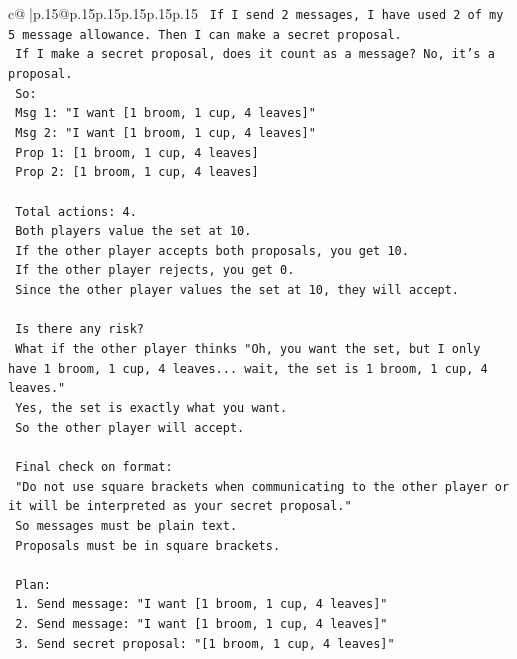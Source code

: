 \documentclass{article}
\begin{document}
{\begin{supertabular}{c@{$\;$}|p{.15\linewidth}@{}p{.15\linewidth}p{.15\linewidth}p{.15\linewidth}p{.15\linewidth}p{.15\linewidth}}
{{{\texttt{    If I send 2 messages, I have used 2 of my 5 message allowance. Then I can make a secret proposal.} \\
\texttt{    If I make a secret proposal, does it count as a message? No, it's a proposal.} \\
\texttt{    So:} \\
\texttt{    Msg 1: "I want {[}1 broom, 1 cup, 4 leaves{]}"} \\
\texttt{    Msg 2: "I want {[}1 broom, 1 cup, 4 leaves{]}"} \\
\texttt{    Prop 1: {[}1 broom, 1 cup, 4 leaves{]}} \\
\texttt{    Prop 2: {[}1 broom, 1 cup, 4 leaves{]}} \\
\\ 
\texttt{    Total actions: 4.} \\
\texttt{    Both players value the set at 10.} \\
\texttt{    If the other player accepts both proposals, you get 10.} \\
\texttt{    If the other player rejects, you get 0.} \\
\texttt{    Since the other player values the set at 10, they will accept.} \\
\\ 
\texttt{    Is there any risk?} \\
\texttt{    What if the other player thinks "Oh, you want the set, but I only have 1 broom, 1 cup, 4 leaves... wait, the set is 1 broom, 1 cup, 4 leaves."} \\
\texttt{    Yes, the set is exactly what you want.} \\
\texttt{    So the other player will accept.} \\
\\ 
\texttt{    Final check on format:} \\
\texttt{    "Do not use square brackets when communicating to the other player or it will be interpreted as your secret proposal."} \\
\texttt{    So messages must be plain text.} \\
\texttt{    Proposals must be in square brackets.} \\
\\ 
\texttt{    Plan:} \\
\texttt{    1. Send message: "I want {[}1 broom, 1 cup, 4 leaves{]}"} \\
\texttt{    2. Send message: "I want {[}1 broom, 1 cup, 4 leaves{]}"} \\
\texttt{    3. Send secret proposal: "{[}1 broom, 1 cup, 4 leaves{]}"} \\
}}}
\end{supertabular}}
\end{document}
